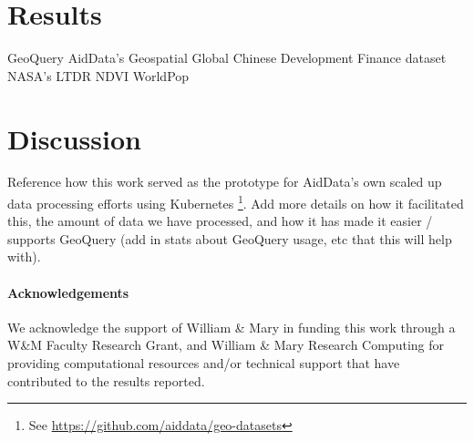 \documentclass[a4paper]{article}
\begin{document}
\section{Results}
\lipsum[1]

GeoQuery\citep{Goodman2019}
AidData's Geospatial Global Chinese Development Finance dataset\citep{Goodman2024}
NASA's LTDR NDVI\citep{NASA2023}
WorldPop\citep{WorldPop2018}


\section{Discussion}

Reference how this work served as the prototype for AidData's own scaled up data processing efforts using Kubernetes \footnote{See \url{https://github.com/aiddata/geo-datasets}}. Add more details on how it facilitated this, the amount of data we have processed, and how it has made it easier / supports GeoQuery (add in stats about GeoQuery usage, etc that this will help with).


\paragraph{Acknowledgements} 

We acknowledge the support of William \& Mary in funding this work through a W\&M Faculty Research Grant, and William \& Mary Research Computing for providing computational resources and/or technical support that have contributed to the results reported. 


	
\end{document}
